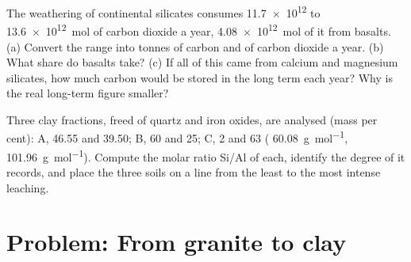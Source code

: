 \begin{exercise}[$\star\star\star$]\label{exo:b1:weathering-clays:11}
The weathering of continental silicates consumes \num{11.7e12} to
\qty{13.6e12}{mol} of carbon dioxide a year, \qty{4.08e12}{mol} of it from
basalts. (a) Convert the range into tonnes of carbon and of carbon dioxide a
year. (b) What share do basalts take? (c) If all of this came from calcium and
magnesium silicates, how much carbon would be stored in the long term each
year? Why is the real long-term figure smaller?
\end{exercise}

\begin{exercise}[$\star\star\star$]\label{exo:b1:weathering-clays:12}
Three clay fractions, freed of quartz and iron oxides, are analysed (mass per
cent): A,  \num{46.55} and  \num{39.50}; B,  60 and
 25; C,  2 and  63 (
\qty{60.08}{g.mol^{-1}},  \qty{101.96}{g.mol^{-1}}). Compute the
molar ratio Si/Al of each, identify the degree of  it records, and
place the three soils on a line from the least to the most intense leaching.
\end{exercise}

\section{Problem: From granite to clay}

